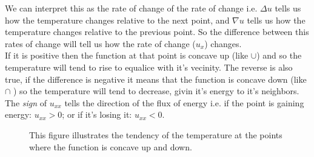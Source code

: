 \documentclass[../pde.tex]{subfiles}
\begin{document}
    We can interpret this as the rate of change of the rate of change i.e. $\Delta u$ tells us how the temperature changes
    relative to the next point, and $\nabla u$ tells us how the temperature changes relative to the previous point. So the
    difference between this rates of change will tell us how the rate of change ($u_x$) changes.\\
    If it is positive then the function at that point is concave up 
    (like $\cup$) and so the temperature will tend to rise to equalice with it's vecinity. The reverse is also true, if the
    difference is negative it means that the function is concave down (like $\cap$ ) so the temperature will tend to decrease,
    givin it's energy to it's neighbors. The \emph{sign} of $u_{xx}$ tells the direction of the flux of energy i.e. if the point
    is gaining energy: $u_{xx}>0$; or if it's losing it: $u_{xx}<0$.

    \begin{figure}[ht]
        \centering
        \caption{This figure illustrates the tendency of the temperature at the points where the function is concave up and down.}
        \label{fig:uxx}
    \end{figure}
    
    
\end{document}
